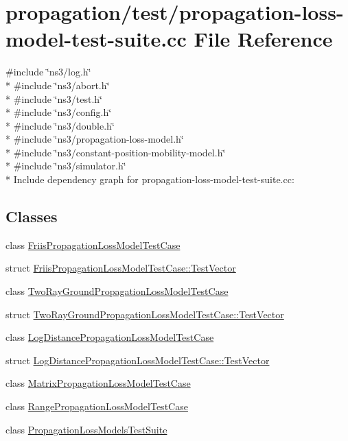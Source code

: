 \hypertarget{propagation-loss-model-test-suite_8cc}{}\section{propagation/test/propagation-\/loss-\/model-\/test-\/suite.cc File Reference}
\label{propagation-loss-model-test-suite_8cc}
{\ttfamily \#include \char`\"{}ns3/log.\+h\char`\"{}}\\*
{\ttfamily \#include \char`\"{}ns3/abort.\+h\char`\"{}}\\*
{\ttfamily \#include \char`\"{}ns3/test.\+h\char`\"{}}\\*
{\ttfamily \#include \char`\"{}ns3/config.\+h\char`\"{}}\\*
{\ttfamily \#include \char`\"{}ns3/double.\+h\char`\"{}}\\*
{\ttfamily \#include \char`\"{}ns3/propagation-\/loss-\/model.\+h\char`\"{}}\\*
{\ttfamily \#include \char`\"{}ns3/constant-\/position-\/mobility-\/model.\+h\char`\"{}}\\*
{\ttfamily \#include \char`\"{}ns3/simulator.\+h\char`\"{}}\\*
Include dependency graph for propagation-\/loss-\/model-\/test-\/suite.cc\+:
\subsection*{Classes}
\begin{DoxyCompactItemize}
\item 
class \hyperlink{classFriisPropagationLossModelTestCase}{Friis\+Propagation\+Loss\+Model\+Test\+Case}
\item 
struct \hyperlink{structFriisPropagationLossModelTestCase_1_1TestVector}{Friis\+Propagation\+Loss\+Model\+Test\+Case\+::\+Test\+Vector}
\item 
class \hyperlink{classTwoRayGroundPropagationLossModelTestCase}{Two\+Ray\+Ground\+Propagation\+Loss\+Model\+Test\+Case}
\item 
struct \hyperlink{structTwoRayGroundPropagationLossModelTestCase_1_1TestVector}{Two\+Ray\+Ground\+Propagation\+Loss\+Model\+Test\+Case\+::\+Test\+Vector}
\item 
class \hyperlink{classLogDistancePropagationLossModelTestCase}{Log\+Distance\+Propagation\+Loss\+Model\+Test\+Case}
\item 
struct \hyperlink{structLogDistancePropagationLossModelTestCase_1_1TestVector}{Log\+Distance\+Propagation\+Loss\+Model\+Test\+Case\+::\+Test\+Vector}
\item 
class \hyperlink{classMatrixPropagationLossModelTestCase}{Matrix\+Propagation\+Loss\+Model\+Test\+Case}
\item 
class \hyperlink{classRangePropagationLossModelTestCase}{Range\+Propagation\+Loss\+Model\+Test\+Case}
\item 
class \hyperlink{classPropagationLossModelsTestSuite}{Propagation\+Loss\+Models\+Test\+Suite}
\end{DoxyCompactItemize}
